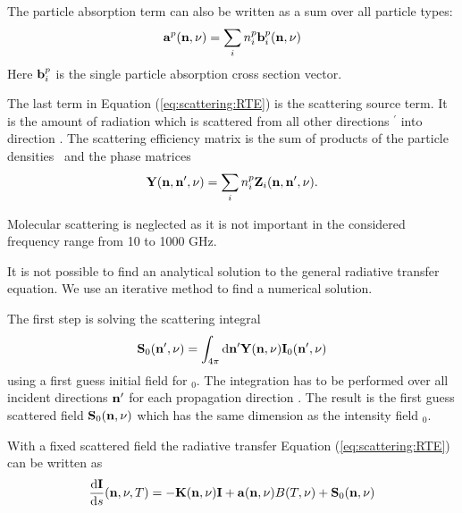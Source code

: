 The particle absorption term can also be written as a sum over all
particle types:
\begin{eqnarray}
  {\bf a}^{p}({\bf n}, \nu) = \sum_i n^p_i {\bf b}^{p}_i ({\bf n}, \nu)
\end{eqnarray}
Here ${\bf b}^{p}_i$ is the single particle absorption cross section
vector. 

The last term in Equation (\ref{eq:scattering:RTE}) is the scattering source
term. It is the 
amount of radiation which is scattered from all other directions \PDir$^\prime$   
into direction \PDir.  The scattering efficiency matrix
\SEfMat is the sum of products  
of the particle densities \PDen\  and the phase matrices \PhaMat
\begin{eqnarray}
{\bf Y}({\bf n}, {\bf n}', \nu) = \sum_i{n^p_i{\bf Z}_i({\bf n}, {\bf n}', \nu)}.
\end{eqnarray}

Molecular scattering is neglected as it is not important in the 
considered frequency range from 10 to 1000 GHz. 


\label{sec:scattering:solution_rte}

It is not possible to find an analytical solution to the general
radiative transfer equation. We use an iterative method to find a
numerical solution.

\label{sec:scattering:scat_int}

The first step is solving the scattering integral
\begin{eqnarray}
  {\bf S}_0 ({\bf n}^\prime, \nu)  = \int_{4\pi} \mathrm{d} {\bf n}^\prime {\bf Y}({\bf n}, \nu) {\bf I}_0({\bf n}^\prime, \nu) 
\end{eqnarray}
using a first guess initial field for \StoVec$_0$\DirFrePr . The integration
has to be performed over all incident directions ${\bf n}^\prime$ for each
propagation direction \PDir{}. The result is the first guess scattered field ${\bf S}_0({\bf n}, \nu)$
which has the same dimension as the intensity field \StoVec$_0$\DirFrePr. 

\label{sec:scattering:RTE}
With a fixed scattered field \ScaInt\DirFre{} the radiative transfer
Equation (\ref{eq:scattering:RTE}) can be written as
\begin{eqnarray}
     \frac{\mathrm{d} {\bf I}}{\mathrm{d} s}({\bf n}, \nu, T) =
     -{\bf K}({\bf n}, \nu){\bf I} + {\bf a}({\bf n}, \nu) B(T, \nu)
     +{\bf S}_0({\bf n}, \nu)
\label{eq:rad_fs_sol}
\end{eqnarray} 

